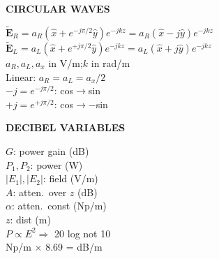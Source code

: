 \documentclass[6pt,letterpaper]{article}
\newcommand{\shead}[3]{%
  \noindent\colorbox{#1}{\parbox{\dimexpr\linewidth-2\fboxsep\relax}%
  {\color{#2}\bfseries\fontsize{6}{7}\selectfont #3}}\vspace{0.5pt}}
\begin{document}
\begin{minipage}[t]{0.19\linewidth}
\shead{amberbg}{amber}{CIRCULAR WAVES}
\begin{ebox}
$\tilde{\mathbf{E}}_R=a_R(\hat{x}+e^{-j\pi/2}\hat{y})e^{-jkz}=a_R(\hat{x}-j\hat{y})e^{-jkz}$\\
$\tilde{\mathbf{E}}_L=a_L(\hat{x}+e^{+j\pi/2}\hat{y})e^{-jkz}=a_L(\hat{x}+j\hat{y})e^{-jkz}$\\
$a_R,a_L,a_x$ in V/m;\;$k$ in rad/m\\
Linear: $a_R=a_L=a_x/2$\\
$-j=e^{-j\pi/2}$: cos$\to$sin\\
$+j=e^{+j\pi/2}$: cos$\to{-}$sin
\end{ebox}
\end{minipage}\hfill
\begin{minipage}[t]{0.19\linewidth}
\shead{amberbg}{amber}{DECIBEL VARIABLES}
\begin{ebox}
$G$: power gain (dB)\\
$P_1,P_2$: power (W)\\
$|E_1|,|E_2|$: field (V/m)\\
$A$: atten.\ over $z$ (dB)\\
$\alpha$: atten.\ const (Np/m)\\
$z$: dist (m)\\
$P\!\propto\!E^2\!\Rightarrow$ 20 log not 10\\
Np/m $\times$ 8.69 = dB/m
\end{ebox}
\end{minipage}
\end{document}
